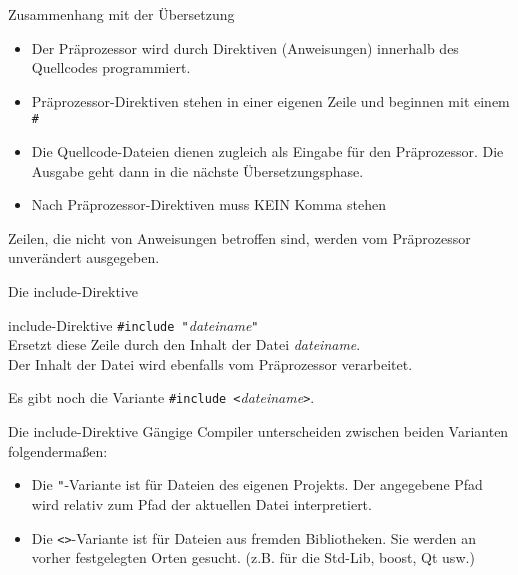 \begin{frame}[fragile]{Zusammenhang mit der Übersetzung}
	\begin{itemize}
		\item Der Präprozessor wird durch Direktiven (Anweisungen) innerhalb des Quellcodes programmiert.
		\item Präprozessor-Direktiven stehen in einer eigenen Zeile und beginnen mit einem \verb|#|
		\item Die Quellcode-Dateien dienen zugleich als Eingabe für den Präprozessor. Die Ausgabe geht dann in die nächste Übersetzungsphase.
		\item Nach Präprozessor-Direktiven muss KEIN Komma stehen
	\end{itemize}
	
	\pause
	\vspace{1em}
	
 	Zeilen, die nicht von Anweisungen betroffen sind, werden vom Präprozessor unverändert ausgegeben.
\end{frame}

\begin{frame}[fragile]{Die include-Direktive}
	\begin{block}{include-Direktive}
		\verb|#include "|\emph{dateiname}\verb|"| \\
		\vspace{0.5em}
		Ersetzt diese Zeile durch den Inhalt der Datei \emph{dateiname}. \\
		Der Inhalt der Datei wird ebenfalls vom Präprozessor verarbeitet.
	\end{block}
	
	\pause
	\vspace{1em}
	
	\small
	Es gibt noch die Variante \verb|#include <|\emph{dateiname}\verb|>|.
\end{frame}

\begin{frame}[fragile]{Die include-Direktive}
	Gängige Compiler unterscheiden zwischen beiden Varianten folgendermaßen:
	\begin{itemize}
		\item Die \verb|"|-Variante ist für Dateien des eigenen Projekts.
		      Der angegebene Pfad wird relativ zum Pfad der aktuellen Datei interpretiert.
		\item Die \verb|<>|-Variante ist für Dateien aus fremden Bibliotheken.
		      Sie werden an vorher festgelegten Orten gesucht. (z.B. für die Std-Lib, boost, Qt usw.)
	\end{itemize}
\end{frame}

